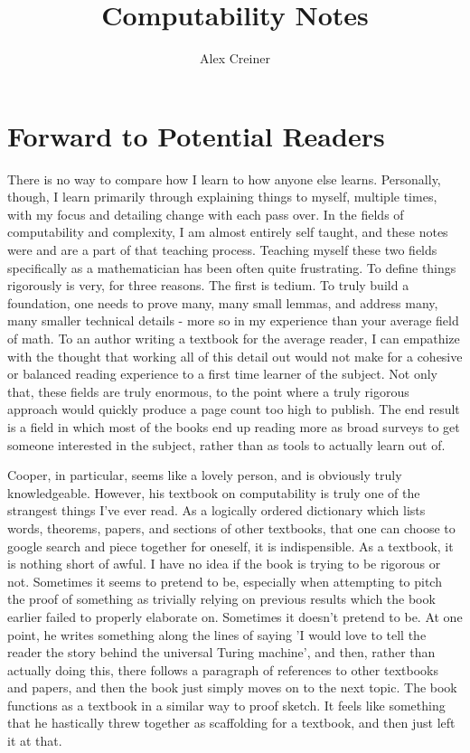 \documentclass{article}
\title{Computability Notes}
\author{Alex Creiner}
\theoremstyle{definition}
\theoremstyle{plain}
\theoremstyle{theorem}
\begin{document}
\tableofcontents

\maketitle
\iffalse
\section{Forward to Potential Readers}
	There is no way to compare how I learn to how anyone else learns. Personally, though, I learn primarily through explaining things to myself, multiple times, with my focus and detailing change with each pass over. In the fields of computability and complexity, I am almost entirely self taught, and these notes were and are a part of that teaching process. Teaching myself these two fields specifically as a mathematician has been often quite frustrating. To define things rigorously is very, for three reasons. The first is tedium. To truly build a foundation, one needs to prove many, many small lemmas, and address many, many smaller technical details - more so in my experience than your average field of math. To an author writing a textbook for the average reader, I can empathize with the thought that working all of this detail out would not make for a cohesive or balanced reading experience to a first time learner of the subject. Not only that, these fields are truly enormous, to the point where a truly rigorous approach would quickly produce a page count too high to publish. The end result is a field in which most of the books end up reading more as broad surveys to get someone interested in the subject, rather than as tools to actually learn out of. 
    \par Cooper, in particular, seems like a lovely person, and is obviously truly knowledgeable. However, his textbook on computability is truly one of the strangest things I've ever read. As a logically ordered dictionary which lists words, theorems, papers, and sections of other textbooks, that one can choose to google search and piece together for oneself, it is indispensible. As a textbook, it is nothing short of awful. I have no idea if the book is trying to be rigorous or not. Sometimes it seems to pretend to be, especially when attempting to pitch the proof of something as trivially relying on previous results which the book earlier failed to properly elaborate on. Sometimes it doesn't pretend to be. At one point, he writes something along the lines of saying 'I would love to tell the reader the story behind the universal Turing machine', and then, rather than actually doing this, there follows a paragraph of references to other textbooks and papers, and then the book just simply moves on to the next topic. The book functions as a textbook in a similar way to proof sketch. It feels like something that he hastically threw together as scaffolding for a textbook, and then just left it at that. 
\end{document}
